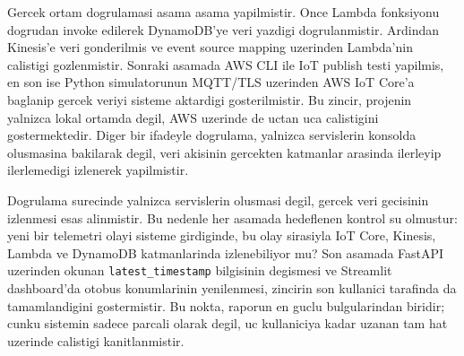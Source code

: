 Gercek ortam dogrulamasi asama asama yapilmistir. Once Lambda fonksiyonu dogrudan invoke edilerek DynamoDB'ye veri yazdigi dogrulanmistir. Ardindan Kinesis'e veri gonderilmis ve event source mapping uzerinden Lambda'nin calistigi gozlenmistir. Sonraki asamada AWS CLI ile IoT publish testi yapilmis, en son ise Python simulatorunun MQTT/TLS uzerinden AWS IoT Core'a baglanip gercek veriyi sisteme aktardigi gosterilmistir. Bu zincir, projenin yalnizca lokal ortamda degil, AWS uzerinde de uctan uca calistigini gostermektedir. Diger bir ifadeyle dogrulama, yalnizca servislerin konsolda olusmasina bakilarak degil, veri akisinin gercekten katmanlar arasinda ilerleyip ilerlemedigi izlenerek yapilmistir.

Dogrulama surecinde yalnizca servislerin olusmasi degil, gercek veri gecisinin izlenmesi esas alinmistir. Bu nedenle her asamada hedeflenen kontrol su olmustur: yeni bir telemetri olayi sisteme girdiginde, bu olay sirasiyla IoT Core, Kinesis, Lambda ve DynamoDB katmanlarinda izlenebiliyor mu? Son asamada FastAPI uzerinden okunan \texttt{latest\_timestamp} bilgisinin degismesi ve Streamlit dashboard'da otobus konumlarinin yenilenmesi, zincirin son kullanici tarafinda da tamamlandigini gostermistir. Bu nokta, raporun en guclu bulgularindan biridir; cunku sistemin sadece parcali olarak degil, uc kullaniciya kadar uzanan tam hat uzerinde calistigi kanitlanmistir.
